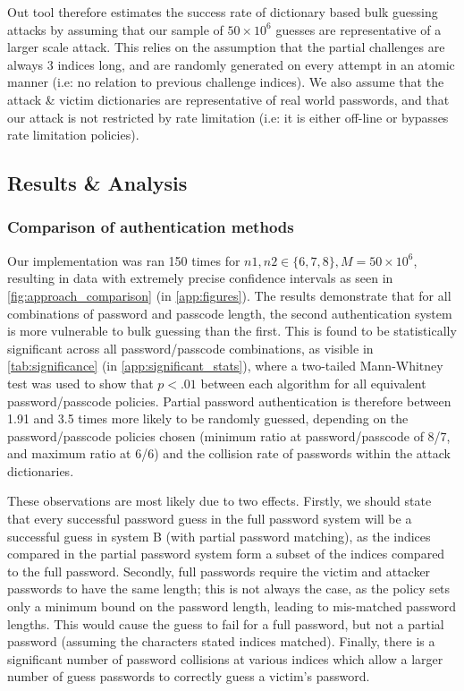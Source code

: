 \documentclass[british,11pt,a4paper]{article}
\begin{document}
Out tool therefore estimates the success rate of dictionary based bulk guessing attacks by assuming that our sample of $50\times 10^6$ guesses are representative of a larger scale attack. This relies on the assumption that the partial challenges are always 3 indices long, and are randomly generated on every attempt in an atomic manner (i.e: no relation to previous challenge indices). We also assume that the attack \& victim dictionaries are representative of real world passwords, and that our attack is not restricted by rate limitation (i.e: it is either off-line or bypasses rate limitation policies).

\subsection{Results \& Analysis}
\subsubsection{Comparison of authentication methods}
\label{subsec:authentication_methods}
Our implementation was ran 150 times for $n1, n2 \in \{6,7,8\}, M = 50 \times 10^6$, resulting in data with extremely precise confidence intervals as seen in \autoref{fig:approach_comparison} (in \autoref{app:figures}). The results demonstrate that for all combinations of password and passcode length, the second authentication system is more vulnerable to bulk guessing than the first. This is found to be statistically significant across all password/passcode combinations, as visible in \autoref{tab:significance} (in \autoref{app:significant_stats}), where a two-tailed Mann-Whitney test was used to show that $p<.01$ between each algorithm for all equivalent password/passcode policies. Partial password authentication is therefore between 1.91 and 3.5 times more likely to be randomly guessed, depending on the password/passcode policies chosen (minimum ratio at password/passcode of 8/7, and maximum ratio at 6/6) and the collision rate of passwords within the attack dictionaries.

These observations are most likely due to two effects. Firstly, we should state that every successful password guess in the full password system will be a successful guess in system B (with partial password matching), as the indices compared in the partial password system form a subset of the indices compared to the full password. Secondly, full passwords require the victim and attacker passwords to have the same length; this is not always the case, as the policy sets only a minimum bound on the password length, leading to mis-matched password lengths. This would cause the guess to fail for a full password, but not a partial password (assuming the characters stated indices matched). Finally, there is a significant number of password collisions at various indices which allow a larger number of guess passwords to correctly guess a victim's password. 
\end{document}
